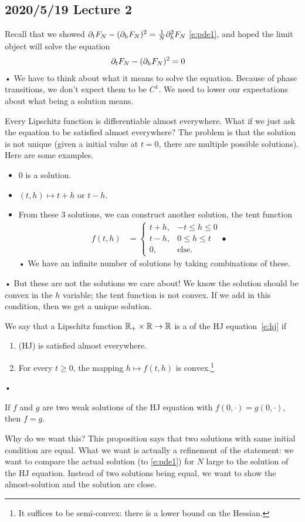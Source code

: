\subsection*{2020/5/19 Lecture 2}

Recall that we showed $\partial_t F_N - (\partial_h F_N)^2 = \frac{1}{N} \partial_h^2 F_N$  \eqref{e:pde1}, and hoped the limit object will solve the equation
\begin{align*}
\partial_t F_N - (\partial_h F_N)^2 &=0
\end{align*}•
We have to think about what it means to solve the equation. Because of phase transitions, we don't expect them to be $C^1$.
We need to lower our expectations about what being a solution means.

Every Lipschitz function is differentiable almost everywhere. What if we just ask the equation to be satisfied almost everywhere?
The problem is that the solution is not unique (given a initial value at $t=0$, there are multiple possible solutions). Here are some examples.
\begin{itemize}
\item
0 is a solution.
\item
$(t,h)\mapsto t+h$ or $t-h$.
\item
From these 3 solutions, we can construct another solution, the tent function
\begin{align*}
f(t,h) &=\begin{cases}
t+h,&-t\le h\le 0\\
t-h,&0\le h\le t\\
0,&\text{else.}
\end{cases}•
\end{align*}•
We have an infinite number of solutions by taking combinations of these.
\end{itemize}•
But these are not the solutions we care about! We know the solution should be convex in the $h$ variable; the tent function is not convex. If we add in this condition, then we get a unique solution.
\begin{df}
We say that a Lipschitz function $\mathbb{R}_+\times \mathbb{R}\to \mathbb{R}$ is a  of the HJ equation~\eqref{e:hj} if
\begin{enumerate}
\item
(HJ) is satisfied almost everywhere.
\item
For every $t\ge 0$, the mapping $h\mapsto f(t,h)$ is convex.\footnote{It suffices to be semi-convex: there is a lower bound on the Hessian.}
\end{enumerate}•
\end{df}
\begin{pr}[Uniqueness]
If $f$ and $g$ are two weak solutions of the HJ equation with $f(0,\cdot)=g(0,\cdot)$, then $f=g$.
\end{pr}
Why do we want this?
This proposition says that two solutions with same initial condition are equal. What we want is actually a refinement of the statement: we want to compare the actual solution (to \eqref{e:pde1}) for $N$ large to the solution of the HJ equation.
Instead of two solutions being equal, we want to show the almost-solution and the solution are close. 

